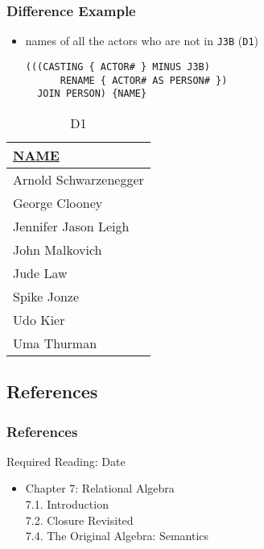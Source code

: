\documentclass[dvipsnames]{beamer}
\theoremstyle{plain}
\begin{document}
\begin{frame}[fragile]
  \frametitle{Difference Example}

  \begin{itemize}
    \item names of all the actors who are not in \texttt{J3B} (\texttt{D1})
    \begin{lstlisting}
(((CASTING { ACTOR# } MINUS J3B)
      RENAME { ACTOR# AS PERSON# })
  JOIN PERSON) {NAME}
    \end{lstlisting}
  \end{itemize}

  \vspace{-10pt}
  \begin{tiny}
  \begin{table}
    \caption{D1}
    \begin{tabular}{|l|}\hline
\underline{NAME}     \\[2pt]\hline\hline
Arnold Schwarzenegger\\\hline
George Clooney       \\\hline
Jennifer Jason Leigh \\\hline
John Malkovich       \\\hline
Jude Law             \\\hline
Spike Jonze          \\\hline
Udo Kier             \\\hline
Uma Thurman          \\\hline
    \end{tabular}
  \end{table}
  \end{tiny}
\end{frame}

\subsection*{References}

\begin{frame}
  \frametitle{References}

  \begin{block}{Required Reading: Date}
    \begin{itemize}
      \item Chapter 7: Relational Algebra\\
        7.1. \alert{Introduction}\\
        7.2. \alert{Closure Revisited}\\
        7.4. \alert{The Original Algebra: Semantics}
    \end{itemize}
  \end{block}
\end{frame}
\end{document}
